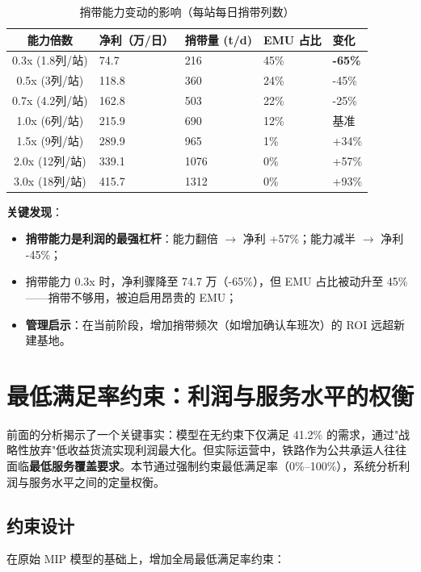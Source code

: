 \documentclass[12pt,a4paper,fontset=none]{ctexart}
\begin{document}
\begin{table}[H]
\centering\small
\caption{捎带能力变动的影响（每站每日捎带列数）}
\begin{tabular}{cC{2cm}C{2cm}C{2cm}C{2cm}}
\toprule
能力倍数 & 净利（万/日） & 捎带量 (t/d) & EMU 占比 & 变化 \\
\midrule
0.3x (1.8列/站) & 74.7 & 216 & 45\% & \textbf{-65\%} \\
0.5x (3列/站)   & 118.8 & 360 & 24\% & -45\% \\
0.7x (4.2列/站) & 162.8 & 503 & 22\% & -25\% \\
1.0x (6列/站)   & 215.9 & 690 & 12\% & 基准 \\
1.5x (9列/站)   & 289.9 & 965 & 1\%  & +34\% \\
2.0x (12列/站)  & 339.1 & 1076 & 0\%  & +57\% \\
3.0x (18列/站)  & 415.7 & 1312 & 0\%  & +93\% \\
\bottomrule
\end{tabular}
\end{table}

\textbf{关键发现}：
\begin{itemize}
    \item \textbf{捎带能力是利润的最强杠杆}：能力翻倍 $\rightarrow$ 净利 +57\%；能力减半 $\rightarrow$ 净利 -45\%；
    \item 捎带能力 0.3x 时，净利骤降至 74.7 万（-65\%），但 EMU 占比被动升至 45\%——捎带不够用，被迫启用昂贵的 EMU；
    \item \textbf{管理启示}：在当前阶段，增加捎带频次（如增加确认车班次）的 ROI 远超新建基地。
\end{itemize}

\section{最低满足率约束：利润与服务水平的权衡}

前面的分析揭示了一个关键事实：模型在无约束下仅满足 41.2\% 的需求，通过"战略性放弃"低收益货流实现利润最大化。但实际运营中，铁路作为公共承运人往往面临\textbf{最低服务覆盖要求}。本节通过强制约束最低满足率（0\%--100\%），系统分析利润与服务水平之间的定量权衡。

\subsection{约束设计}

在原始 MIP 模型的基础上，增加全局最低满足率约束：
\end{document}
